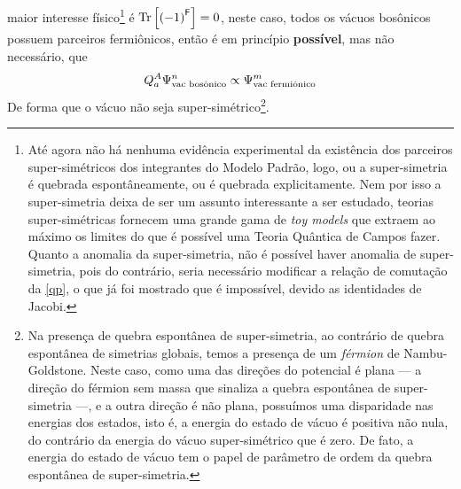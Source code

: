 maior interesse físico\footnote{Até agora não há nenhuma evidência experimental da existência dos parceiros super-simétricos dos integrantes do Modelo Padrão, logo, 
ou a super-simetria é quebrada espontâneamente, ou é quebrada explicitamente. Nem por isso a super-simetria deixa de ser um assunto interessante a ser estudado, teorias super-simétricas 
fornecem uma grande gama de \textit{toy models} que extraem ao máximo os limites do que é possível uma Teoria Quântica de Campos fazer. Quanto a anomalia da super-simetria, não é possível haver anomalia de super-simetria, 
pois do contrário, seria necessário modificar a relação de comutação da \cref{qp}, o que já foi mostrado que é impossível, devido as identidades de Jacobi.} é $\Tr\qty[\qty(-1)^{\mathsf F}]=0$, neste caso, todos os vácuos 
bosônicos possuem parceiros fermiônicos, então é em princípio \textbf{possível}, mas não necessário, que\[Q^A_a\Psi^n_{\textnormal{vac bosônico}}\propto\Psi^m_{\textnormal{vac fermiônico}}\]De forma que o vácuo não seja super-simétrico\footnote{Na presença 
de quebra espontânea de super-simetria, ao contrário de quebra espontânea de simetrias globais, temos a presença de um \textit{férmion} de Nambu-Goldstone. Neste caso, como uma das direções do potencial é plana --- 
a direção do férmion sem massa que sinaliza a quebra espontânea de super-simetria ---, e a outra direção é não plana, possuímos uma disparidade nas energias dos estados, isto é, a energia do estado de vácuo é positiva não nula, do 
contrário da energia do vácuo super-simétrico que é zero. 
De fato, a energia do estado de vácuo tem o papel de parâmetro de ordem da quebra espontânea de super-simetria.}.